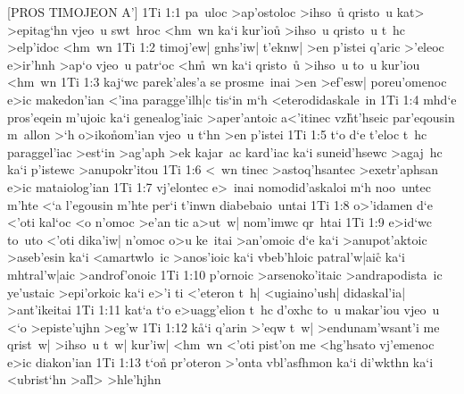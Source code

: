 [PROS TIMOJEON A']
\vs 1Ti 1:1
pa~uloc
>ap'ostoloc
>ihso~u\r{}
qristo~u
kat>
>epitag`hn
vjeo~u
swt~hroc
<hm~wn
ka`i
kur'iou\r{}
>ihso~u
qristo~u
t~hc
>elp'idoc
<hm~wn\bibvsend
\vs 1Ti 1:2
timoj'ew|
gnhs'iw|
t'eknw|
>en
p'istei
q'aric
>'eleoc
e>ir'hnh
>ap`o
vjeo~u
patr`oc
<h\r{m}~wn
ka`i
qristo~u\r{}
>ihso~u
to~u
kur'iou
<hm~wn\bibvsend
\vs 1Ti 1:3
kaj`wc
parek'ales'a
se
prosme~inai
>en
>ef'esw|
poreu'omenoc
e>ic
makedon'ian
<'ina
paragge'ilh|c
tis`in
m`h
<eterodidaskale~in\bibvsend
\vs 1Ti 1:4
mhd`e
pros'eqein
m'ujoic
ka`i
genealog'iaic
>aper'antoic
a<'itinec
vz\r{h}\-t'h\-seic
par'eqousin
m~allon
>`h
o>iko\r{n}om'ian
vjeo~u
t`hn
>en
p'istei\bibvsend
\vs 1Ti 1:5
t`o
d`e
t'eloc
t~hc
paraggel'iac
>est`in
>ag'aph
>ek
kajar~ac
kard'iac
ka`i
suneid'hsewc
>agaj~hc
ka`i
p'istewc
>anupokr'itou\bibvsend
\vs 1Ti 1:6
<~wn
tinec
>astoq'hsantec
>exetr'aphsan
e>ic
mataiolog'ian\bibvsend
\vs 1Ti 1:7
vj'elontec
e>~inai
nomodid'askaloi
m`h
noo~untec
m'hte
<`a
l'egousin
m'hte
per`i
t'inwn
diabebaio~untai\bibvsend
\vs 1Ti 1:8
o>'idamen
d`e
<'oti
kal`oc
<o
n'omoc
>e'an
tic
a>ut~w|
nom'imwc
qr~htai\bibvsend
\vs 1Ti 1:9
e>id`wc
to~uto
<'oti
dika'iw|
n'omoc
o>u
ke~itai
>an'omoic
d`e
ka`i
>anupot'aktoic
>aseb'esin
ka`i
<amartwlo~ic
>anos'ioic
ka`i
vbeb'hloic
patral'w|aic\r{}
ka`i
mhtral'w|aic
>androf'onoic\bibvsend
\vs 1Ti 1:10
p'ornoic
>arsenoko'itaic
>andrapodista~ic
ye'ustaic
>epi'orkoic
ka`i
e>'i
ti
<'eteron
t~h|
<ugiaino'ush|
didaskal'ia|
>ant'ikeitai\bibvsend
\vs 1Ti 1:11
kat`a
t`o
e>uagg'elion
t~hc
d'oxhc
to~u
makar'iou
vjeo~u
<`o
>episte'ujhn
>eg'w\bibvsend
\vs 1Ti 1:12
k\r{a}`i
q'arin
>'eqw
t~w|
>endunam'wsant'i
me
qrist~w|
>ihso~u
t~w|
kur'iw|
<hm~wn
<'oti
pist'on
me
<hg'hsato
vj'emenoc
e>ic
diakon'ian\bibvsend
\vs 1Ti 1:13
t`o\r{n}
pr'oteron
>'onta
vbl'asfhmon
ka`i
di'wkthn
ka`i
<ubrist`hn
>al\r{l}>
>hle'hjhn
